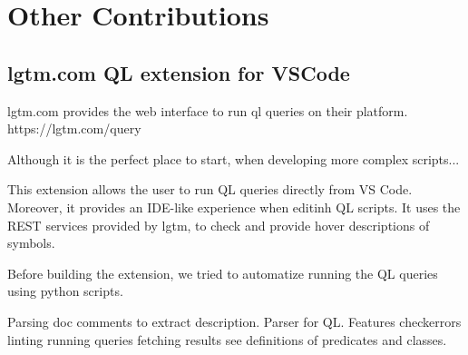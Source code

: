 
\chapter{Other Contributions}

\section{lgtm.com QL extension for VSCode}

lgtm.com provides the web interface to run ql queries on their platform.
https://lgtm.com/query

Although it is the perfect place to start, when developing more complex scripts...

This extension allows the user to run QL queries directly from VS Code.
Moreover, it provides an IDE-like experience when editinh QL scripts.
It uses the REST services provided by lgtm, to check and provide hover descriptions of symbols.

Before building the extension, we tried to automatize running the QL queries using python
scripts.

Parsing doc comments to extract description.
Parser for QL.
Features
checkerrors linting
running queries
fetching results
see definitions of predicates and classes.
